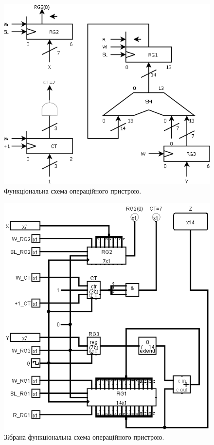 \documentclass[a4paper, 10pt]{article}
\begin{document}
\begin{figure}[H]
\begin{center}
\includegraphics[scale=0.5]{fs.png}
\caption{Функціональна схема операційного пристрою.}
\end{center}
\end{figure}

\begin{figure}[H]
\begin{center}
\includegraphics[scale=0.75, angle=0]{od_circ.png}
\caption{Зiбрана функціональна схема операційного пристрою.}
\end{center}
\end{figure}
\end{document}
